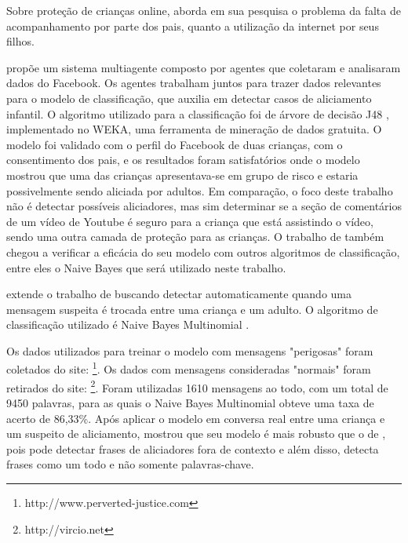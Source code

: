 Sobre proteção de crianças online,  aborda em sua pesquisa o problema da falta de acompanhamento por parte dos pais, quanto a utilização da internet por seus filhos. 

 propõe um sistema multiagente composto por agentes que coletaram e analisaram dados do Facebook. Os agentes trabalham juntos para trazer dados relevantes para o modelo de classificação, que auxilia em detectar casos de aliciamento infantil. O algoritmo utilizado para a classificação foi de árvore de decisão J48 \cite{quinlan1986induction}, implementado no WEKA, uma ferramenta de mineração de dados gratuita. O modelo foi validado com o perfil do Facebook de duas crianças, com o consentimento dos pais, e os resultados foram satisfatórios onde o modelo mostrou que uma das crianças apresentava-se em grupo de risco e estaria possivelmente sendo aliciada por adultos. 
Em comparação, o foco deste trabalho não é detectar possíveis aliciadores, mas sim determinar se a seção de comentários de um vídeo de Youtube é seguro para a criança que está assistindo o vídeo, sendo uma outra camada de proteção para as crianças. O trabalho de  também chegou a verificar a eficácia do seu modelo com outros algoritmos de classificação, entre eles o Naive Bayes que será utilizado neste trabalho.

 extende o trabalho de  buscando detectar automaticamente quando uma mensagem suspeita é trocada entre uma criança e um adulto. O algoritmo de classificação utilizado é Naive Bayes Multinomial \cite{metsis2006spamBayes}.

Os dados utilizados para treinar o modelo com mensagens "perigosas" foram coletados do site: \footnote{http://www.perverted-justice.com}. Os dados com mensagens consideradas "normais" foram retirados do site: \footnote{http://vircio.net}. Foram utilizadas 1610 mensagens ao todo, com um total de 9450 palavras, para as quais o Naive Bayes Multinomial obteve uma taxa de acerto de 86,33\%. Após aplicar o modelo em conversa real entre uma criança e um suspeito de aliciamento,  mostrou que seu modelo é mais robusto que o de , pois pode detectar frases de aliciadores fora de contexto e além disso, detecta frases como um todo e não somente palavras-chave.

